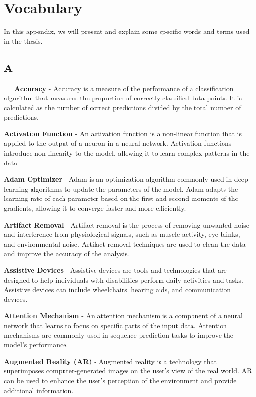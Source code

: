 \chapter{Vocabulary}\label{app:vocabulary}
In this appendix, we will present and explain some specific words and terms used in the thesis.

\section*{A}

\-\ \-\ \-\ \textbf{Accuracy} - Accuracy is a measure of the performance of a classification algorithm that measures the proportion of correctly classified data points. It is calculated as the number of correct predictions divided by the total number of predictions.

\textbf{Activation Function} - An activation function is a non-linear function that is applied to the output of a neuron in a neural network. Activation functions introduce non-linearity to the model, allowing it to learn complex patterns in the data.

\textbf{Adam Optimizer} - Adam is an optimization algorithm commonly used in deep learning algorithms to update the parameters of the model. Adam adapts the learning rate of each parameter based on the first and second moments of the gradients, allowing it to converge faster and more efficiently.

\textbf{Artifact Removal} - Artifact removal is the process of removing unwanted noise and interference from physiological signals, such as muscle activity, eye blinks, and environmental noise. Artifact removal techniques are used to clean the data and improve the accuracy of the analysis.

\textbf{Assistive Devices} - Assistive devices are tools and technologies that are designed to help individuals with disabilities perform daily activities and tasks. Assistive devices can include wheelchairs, hearing aids, and communication devices.

\textbf{Attention Mechanism} - An attention mechanism is a component of a neural network that learns to focus on specific parts of the input data. Attention mechanisms are commonly used in sequence prediction tasks to improve the model's performance.

\textbf{Augmented Reality (AR)} - Augmented reality is a technology that superimposes computer-generated images on the user's view of the real world. AR can be used to enhance the user's perception of the environment and provide additional information.

